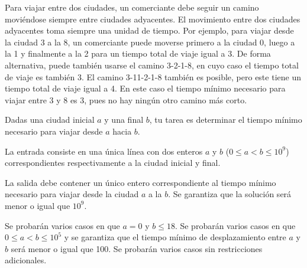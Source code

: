 \documentclass{oci}
\begin{document}
\begin{problemDescription}
Para viajar entre dos ciudades, un comerciante debe seguir un camino moviéndose
siempre entre ciudades adyacentes.
El movimiento entre dos ciudades adyacentes toma siempre una unidad de tiempo.
Por ejemplo, para viajar desde la ciudad 3 a la 8, un comerciante puede moverse primero
a la ciudad 0, luego a la 1 y finalmente a la 2 para un tiempo total de viaje igual a 3.
De forma alternativa, puede también usarse el camino 3-2-1-8, en cuyo caso el tiempo total de viaje
es también 3.
El camino 3-11-2-1-8 también es posible, pero este tiene un tiempo total de viaje igual a 4.
En este caso el tiempo mínimo necesario para viajar entre 3 y 8 es 3, pues no hay ningún otro camino
más corto.

Dadas una ciudad inicial $a$ y una final $b$, tu tarea es determinar el tiempo mínimo
necesario para viajar desde $a$ hacia $b$.
\end{problemDescription}

\begin{inputDescription}
  La entrada consiste en una única línea con dos enteros $a$ y $b$ ($0\leq a < b \leq 10^9$)
  correspondientes respectivamente a la ciudad inicial y final.
\end{inputDescription}

\begin{outputDescription}
  La salida debe contener un único entero correspondiente al tiempo mínimo necesario
  para viajar desde la ciudad $a$ a la $b$.
  Se garantiza que la solución será menor o igual que $10^9$.
\end{outputDescription}

\begin{scoreDescription}
  Se probarán varios casos en que $a = 0$ y $b \leq 18$.
  Se probarán varios casos en que $0\leq a < b \leq 10^5$ y se garantiza que el tiempo mínimo de
  desplazamiento entre $a$ y $b$ será menor o igual que 100.
  Se probarán varios casos sin restricciones adicionales.
\end{scoreDescription}

\begin{sampleDescription}
\end{sampleDescription}
\end{document}
